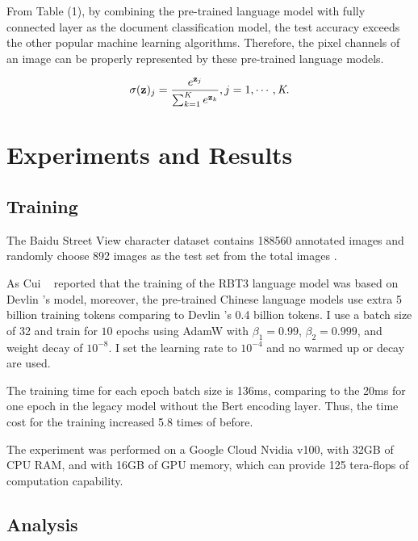 \documentclass[review]{cvpr}
\begin{document}
\par From Table (1), by combining the pre-trained language model with fully connected layer as the document classification model,
the test accuracy exceeds the other popular machine learning algorithms.
Therefore, the pixel channels of an image can be properly represented by these pre-trained language models.


\begin{equation}
  \sigma(\textbf{z})_j = {e^{\textbf{z}_j} \over {\sum_{k=1}^{\textit{K}} e^{\textbf{z}_k}}}, j=1,\cdots,\textit{K}.
\end{equation}



\section{Experiments and Results}


\subsection{Training}

The Baidu Street View character dataset contains 188560 annotated images and randomly choose 892 images as the test set from the total images .

As Cui \etal~\cite{cui2020revisiting} reported that the training of the RBT3 language model was based on Devlin \etal's model,
moreover, the pre-trained Chinese language models use extra 5 billion training tokens comparing to Devlin \etal's 0.4 billion tokens.
I use a batch size of 32 and train for $10$ epochs using AdamW with $\beta_1=0.99$, $\beta_2=0.999$, and weight decay of $10^{-8}$.
I set the learning rate to $10^{-4}$ and no warmed up or decay are used.

\par The training time for each epoch batch size is 136ms, comparing to the 20ms for one epoch in the legacy model without the Bert encoding layer.
Thus, the time cost for the training increased 5.8 times of before.

\par The experiment was performed on a Google Cloud Nvidia v100, with 32GB of CPU RAM, and with 16GB of GPU memory,
which can provide 125 tera-flops of computation capability.

\subsection{Analysis}
\end{document}
